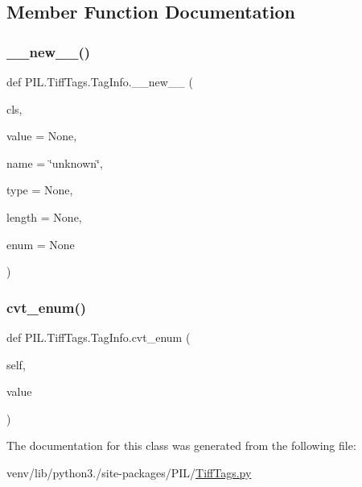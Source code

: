 \subsection{Member Function Documentation}
\mbox{\label{classPIL_1_1TiffTags_1_1TagInfo_a2346122385c2988bfe12537a63e75fea}} 
\subsubsection{\texorpdfstring{\+\_\+\+\_\+new\+\_\+\+\_\+()}{\_\_new\_\_()}}
{\footnotesize\ttfamily def P\+I\+L.\+Tiff\+Tags.\+Tag\+Info.\+\_\+\+\_\+new\+\_\+\+\_\+ (\begin{DoxyParamCaption}\item[{}]{cls,  }\item[{}]{value = {\ttfamily None},  }\item[{}]{name = {\ttfamily \char`\"{}unknown\char`\"{}},  }\item[{}]{type = {\ttfamily None},  }\item[{}]{length = {\ttfamily None},  }\item[{}]{enum = {\ttfamily None} }\end{DoxyParamCaption})}

\mbox{\label{classPIL_1_1TiffTags_1_1TagInfo_a4289a55bab3269f857d11ec4fdaf3268}} 
\subsubsection{\texorpdfstring{cvt\+\_\+enum()}{cvt\_enum()}}
{\footnotesize\ttfamily def P\+I\+L.\+Tiff\+Tags.\+Tag\+Info.\+cvt\+\_\+enum (\begin{DoxyParamCaption}\item[{}]{self,  }\item[{}]{value }\end{DoxyParamCaption})}



The documentation for this class was generated from the following file\+:\begin{DoxyCompactItemize}
\item 
venv/lib/python3./site-\/packages/\+P\+I\+L/\hyperlink{TiffTags_8py}{Tiff\+Tags.\+py}\end{DoxyCompactItemize}
